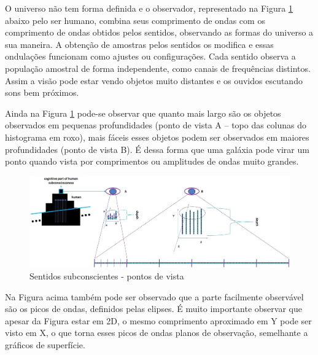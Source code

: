 O universo não tem forma definida e o observador, representado na Figura \ref{fig:consciousness_amplitude_viewpoint} abaixo pelo ser humano, combina seus comprimento de ondas com os comprimento de ondas obtidos pelos sentidos, observando as formas do universo a sua maneira. A obtenção de amostras pelos sentidos os modifica e essas ondulações funcionam como ajustes ou configurações. Cada sentido observa a população amostral de forma independente, como canais de frequências distintos. Assim a visão pode estar vendo objetos muito distantes e os ouvidos escutando sons bem próximos.

Ainda na Figura \ref{fig:consciousness_amplitude_viewpoint}  pode-se observar que quanto mais largo são os objetos observados em pequenas profundidades (ponto de vista A – topo das colunas do histograma em roxo), mais fáceis esses objetos podem ser observados em maiores profundidades (ponto de vista B). É dessa forma que uma galáxia pode virar um ponto quando vista por comprimentos ou amplitudes de ondas muito grandes.
	\begin{figure}[H]
	\caption{Sentidos subconscientes - pontos de vista}
	\label{fig:consciousness_amplitude_viewpoint}
	\centering
	\includegraphics[scale=.4]{sections/images/consciousness_amplitude_viewpoint.jpg}
	\end{figure}

Na Figura acima também pode ser observado que a parte facilmente observável são os picos de ondas, definidos pelas elipses. É muito importante observar que apesar da Figura estar em 2D, o mesmo comprimento aproximado em Y pode ser visto em X, o que torna esses picos de ondas planos de observação, semelhante a gráficos de superfície.

